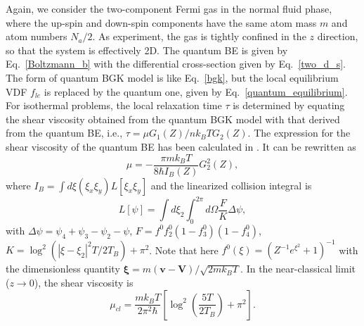 Again, we consider the two-component Fermi gas in the normal fluid phase, where the up-spin and down-spin components have the same atom mass $m$ and atom numbers $N_a/2$. As experiment, the gas is tightly confined in the $z$ direction, so that the system is effectively 2D. The quantum BE is given by Eq.~\eqref{Boltzmann_b} with the differential cross-section given by Eq.~\eqref{two_d_s}. The form of quantum BGK model is like Eq.~\eqref{bgk}, but the local equilibrium VDF $f_{le}$ is replaced by the quantum one, given by Eq.~\eqref{quantum_equilibrium}. For isothermal problems, the local relaxation time $\tau$ is determined by equating the shear viscosity obtained from the quantum BGK model with that derived from the quantum BE, i.e., $\tau={\mu{}G_1(Z)}/{nk_BT}{G_2(Z)}$. The expression for the shear viscosity of the quantum BE has been calculated in
\cite{bruun_2012,arxiv_sch}. It can be rewritten as
\begin{equation}\label{eta2}
    \mu=-\frac{\pi mk_BT}{8{\hbar}I_B(Z)}G_2^2(Z),
\end{equation}
where $I_B=\int{d}\xi (\xi_x\xi_y)    {L}[\xi_x\xi_y]$ and the linearized collision integral is
\begin{equation}\label{coll_linearized}
    {L}[\psi]=\int{d{{\xi}}_2}\int_0^{2\pi}{d}\Omega\frac{F}{K}\Delta\psi,
\end{equation}
with $\Delta\psi=\psi_4+\psi_3-\psi_2-\psi$,
$F={{f^0f_2^0(1-f_3^0)(1-f_4^0)}}$,
$K={\log^2(|\xi-\xi_2|^2T/2T_B)+\pi^2}$.
Note that here $f^0(\xi)=(Z^{-1}e^{\xi^2}+1)^{-1}$ with the
dimensionless quantity
$\mathbf{\xi}=m(\textbf{v}-\textbf{V})/\sqrt{2mk_BT}$. In the
near-classical limit ($z\rightarrow0$), the shear viscosity is~\cite{arxiv_sch}
\begin{equation}\label{eta_classical}
    \mu_{cl}=\frac{mk_BT}{2\pi^2\hbar}\left[\log^2\left(\frac{5T}{2T_B}\right)+\pi^2\right].
\end{equation}




